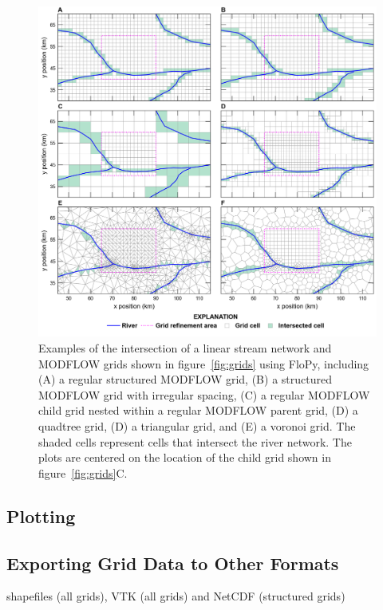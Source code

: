 \documentclass[11pt, oneside]{article}   	%
\begin{document}
\begin{figure}[ht!]
	\begin{center}
		\includegraphics{figures/grids_intersection.png}
	\end{center}
	\caption{Examples of the intersection of a linear stream network and MODFLOW grids shown in figure~\ref{fig:grids} using FloPy, including (A) a regular structured MODFLOW grid, (B) a structured MODFLOW grid with irregular spacing, (C) a regular MODFLOW child grid nested within a regular MODFLOW parent grid, (D) a quadtree grid, (D) a triangular grid, and (E) a voronoi grid. The shaded cells represent cells that intersect the river network. The plots are centered on the location of the child grid shown in figure~\ref{fig:grids}C.}
	\label{fig:intersections}
\end{figure}


\subsection{Plotting}

\subsection{Exporting Grid Data to Other Formats}

shapefiles (all grids), VTK (all grids) and NetCDF (structured grids)
\end{document}
